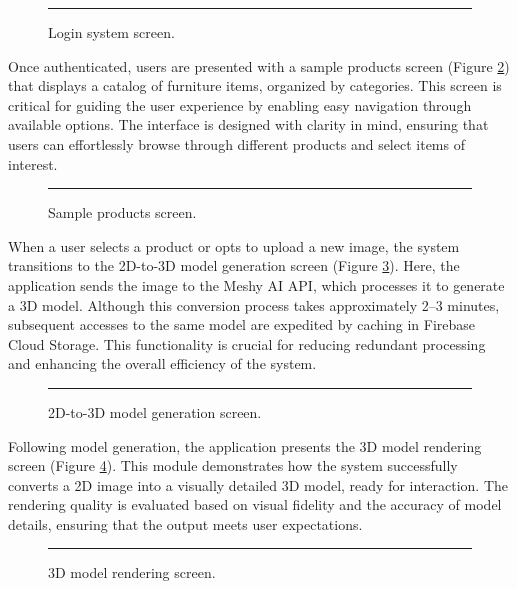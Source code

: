 \documentclass[12pt, a4paper]{article}
\begin{document}
\begin{figure}[htbp]
    \centering
    \rule{0.8\columnwidth}{5cm} %
    \caption{Login system screen.}
    \label{fig:login_screen}
\end{figure}

Once authenticated, users are presented with a sample products screen (Figure \ref{fig:products_screen}) that displays a catalog of furniture items, organized by categories. This screen is critical for guiding the user experience by enabling easy navigation through available options. The interface is designed with clarity in mind, ensuring that users can effortlessly browse through different products and select items of interest.

\begin{figure}[htbp]
    \centering
    \rule{0.8\columnwidth}{5cm} %
    \caption{Sample products screen.}
    \label{fig:products_screen}
\end{figure}

When a user selects a product or opts to upload a new image, the system transitions to the 2D-to-3D model generation screen (Figure \ref{fig:generation_screen}). Here, the application sends the image to the Meshy AI API, which processes it to generate a 3D model. Although this conversion process takes approximately 2--3 minutes, subsequent accesses to the same model are expedited by caching in Firebase Cloud Storage. This functionality is crucial for reducing redundant processing and enhancing the overall efficiency of the system.

\begin{figure}[htbp]
    \centering
    \rule{0.8\columnwidth}{5cm} %
    \caption{2D-to-3D model generation screen.}
    \label{fig:generation_screen}
\end{figure}

Following model generation, the application presents the 3D model rendering screen (Figure \ref{fig:rendering_screen}). This module demonstrates how the system successfully converts a 2D image into a visually detailed 3D model, ready for interaction. The rendering quality is evaluated based on visual fidelity and the accuracy of model details, ensuring that the output meets user expectations.

\begin{figure}[htbp]
    \centering
    \rule{0.8\columnwidth}{5cm} %
    \caption{3D model rendering screen.}
    \label{fig:rendering_screen}
\end{figure}
\end{document}

